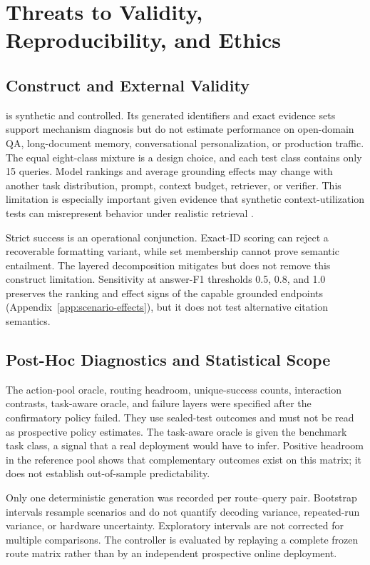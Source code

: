 \section{Threats to Validity, Reproducibility, and Ethics}
\label{sec:limitations}

\subsection{Construct and External Validity}

\bench{} is synthetic and controlled. Its generated identifiers and exact evidence
sets support mechanism diagnosis but do not estimate performance on open-domain QA,
long-document memory, conversational personalization, or production traffic. The
equal eight-class mixture is a design choice, and each test class contains only 15
queries. Model rankings and average grounding effects may change with another task
distribution, prompt, context budget, retriever, or verifier. This limitation is
especially important given evidence that synthetic context-utilization tests can
misrepresent behavior under realistic retrieval \cite{HagstromEtAl2025RealityCheck}.

Strict success is an operational conjunction. Exact-ID scoring can reject a
recoverable formatting variant, while set membership cannot prove semantic
entailment. The layered decomposition mitigates but does not remove this construct
limitation. Sensitivity at answer-F1 thresholds 0.5, 0.8, and 1.0 preserves the
ranking and effect signs of the capable grounded endpoints (Appendix~\ref{app:scenario-effects}),
but it does not test alternative citation semantics.

\subsection{Post-Hoc Diagnostics and Statistical Scope}

The action-pool oracle, routing headroom, unique-success counts, interaction
contrasts, task-aware oracle, and failure layers were specified after the
confirmatory policy failed. They use sealed-test outcomes and must not be read as
prospective policy estimates. The task-aware oracle is given the benchmark task
class, a signal that a real deployment would have to infer. Positive headroom in
the reference pool shows that complementary outcomes exist on this matrix; it does
not establish out-of-sample predictability.

Only one deterministic generation was recorded per route--query pair. Bootstrap
intervals resample scenarios and do not quantify decoding variance, repeated-run
variance, or hardware uncertainty. Exploratory intervals are not corrected for
multiple comparisons. The controller is evaluated by replaying a complete frozen
route matrix rather than by an independent prospective online deployment.

